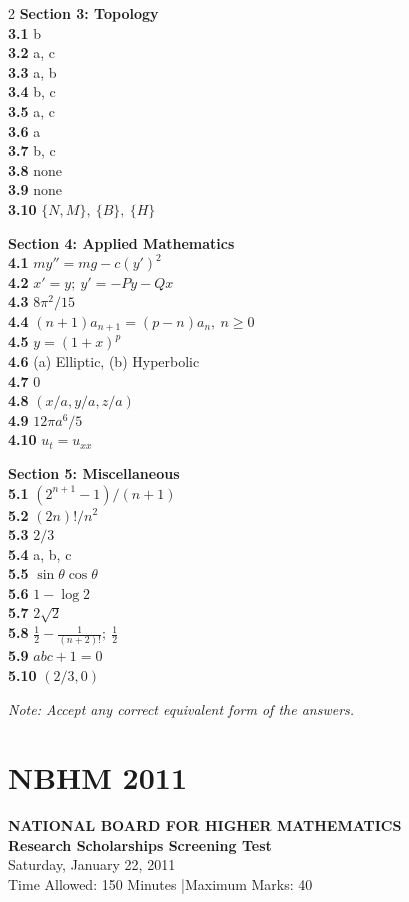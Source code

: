 \documentclass[11pt,a4paper]{article}
\newcommand{\examheader}[4]{%
  \clearpage
  \section{#1}
  \begin{center}
    {\large\bfseries NATIONAL BOARD FOR HIGHER MATHEMATICS}\\[3pt]
    {\bfseries #2}\\[2pt]
    {#3}\\[2pt]
    {\small #4}
  \end{center}
  \vspace{4pt}
}
\begin{document}
\begin{multicols}{2}
\medskip
\textbf{Section 3: Topology}\\
\textbf{3.1} b\\
\textbf{3.2} a, c\\
\textbf{3.3} a, b\\
\textbf{3.4} b, c\\
\textbf{3.5} a, c\\
\textbf{3.6} a\\
\textbf{3.7} b, c\\
\textbf{3.8} none\\
\textbf{3.9} none\\
\textbf{3.10} $\{N, M\},\ \{B\},\ \{H\}$

\medskip
\textbf{Section 4: Applied Mathematics}\\
\textbf{4.1} $my'' = mg - c(y')^2$\\
\textbf{4.2} $x' = y;\ y' = -Py - Qx$\\
\textbf{4.3} $8\pi^2/15$\\
\textbf{4.4} $(n+1)a_{n+1} = (p - n)a_n,\ n \ge 0$\\
\textbf{4.5} $y = (1 + x)^p$\\
\textbf{4.6} (a) Elliptic, (b) Hyperbolic\\
\textbf{4.7} $0$\\
\textbf{4.8} $(x/a, y/a, z/a)$\\
\textbf{4.9} $12\pi a^6/5$\\
\textbf{4.10} $u_t = u_{xx}$

\medskip
\textbf{Section 5: Miscellaneous}\\
\textbf{5.1} $(2^{n+1} - 1)/(n + 1)$\\
\textbf{5.2} $(2n)!/n^2$\\
\textbf{5.3} $2/3$\\
\textbf{5.4} a, b, c\\
\textbf{5.5} $\sin\theta\cos\theta$\\
\textbf{5.6} $1 - \log 2$\\
\textbf{5.7} $2\sqrt{2}$\\
\textbf{5.8} $\frac{1}{2} - \frac{1}{(n+2)!};\ \frac{1}{2}$\\
\textbf{5.9} $abc + 1 = 0$\\
\textbf{5.10} $(2/3, 0)$

\medskip
\noindent\emph{Note: Accept any correct equivalent form of the answers.}
\end{multicols}
\examheader{NBHM 2011}{Research Scholarships Screening Test}{Saturday, January 22, 2011}{Time Allowed: 150 Minutes \quad|\quad Maximum Marks: 40}
\end{document}
